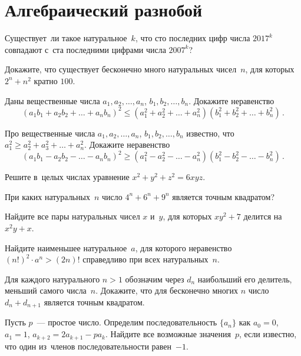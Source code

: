 
\section*{Алгебраический разнобой}


\begin{problems}

\item
Существует~ли такое натуральное~$k$, что сто последних цифр числа $2017^{k}$
совпадают с~ста последними цифрами числа $2007^{k}$?

\item
Докажите, что существует бесконечно много натуральных чисел~$n$, для которых
$2^{n} + n^{2}$ кратно $100$.

\item
Даны вещественные числа $a_1, a_2, \ldots, a_n$, $b_1, b_2, \ldots, b_n$.
Докажите неравенство
\[
    (a_{1} b_{1} + a_{2} b_{2} + \ldots + a_{n} b_{n})^2
\leq
    (a_{1}^2 + a_{2}^2 + \ldots + a_{n}^2)
    (b_{1}^2 + b_{2}^2 + \ldots + b_{n}^2)
\, . \]

\item
Про вещественные числа $a_1, a_2, \ldots, a_n$, $b_1, b_2, \ldots, b_n$
известно, что
$a_1^2 \geq a_2^2 + a_3^2 + \ldots + a_n^2$.
Докажите неравенство
\[
    (a_{1} b_{1} - a_{2} b_{2} - \ldots - a_{n} b_{n})^2
\geq
    (a_{1}^2 - a_{2}^2 - \ldots - a_{n}^2)
    (b_{1}^2 - b_{2}^2 - \ldots - b_{n}^2)
\, . \]

\item
Решите в~целых числах уравнение $x^2 + y^2 + z^2 = 6 x y z$.

\item
При каких натуральных~$n$ число $4^{n} + 6^{n} + 9^{n}$ является точным
квадратом?

\item
Найдите все пары натуральных чисел $x$ и~$y$, для которых $x y^2 + 7$ делится
на~$x^2 y + x$.

\item
Найдите наименьшее натуральное~$a$, для которого неравенство
$(n!)^2 \cdot a^n > (2n)!$ справедливо при всех натуральных~$n$.

\item
Для каждого натурального $n > 1$ обозначим через $d_{n}$ наибольший его
делитель, меньший самого числа~$n$.
Докажите, что для бесконечно многих $n$ число $d_{n} + d_{n+1}$ является точным
квадратом.

\item
Пусть $p$~--- простое число.
Определим последовательность $\{ a_{n} \}$ как $a_0 = 0$, $a_1 = 1$,
$a_{k+2} = 2 a_{k+1} - p a_k$.
Найдите все возможные значения~$p$, если известно, что один из~членов
последовательности равен~$-1$.

\end{problems}

